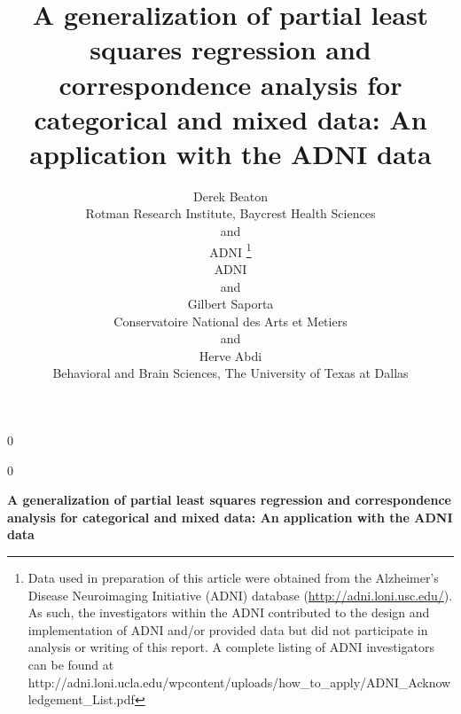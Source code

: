\documentclass[12pt]{article}
\newcommand{\blind}{0}
\begin{document}
\def\spacingset#1{\renewcommand{\baselinestretch}%
{#1}\small\normalsize} \spacingset{1}



\blind
{
  \title{\bf A generalization of partial least squares regression and correspondence
analysis for categorical and mixed data: An application with the ADNI
data}

  \author{
        Derek Beaton \\
    Rotman Research Institute, Baycrest Health Sciences\\
     and \\     ADNI \thanks{Data used in preparation of this article were obtained from the
Alzheimer's Disease Neuroimaging Initiative (ADNI) database
(\url{http://adni.loni.usc.edu/}). As such, the investigators within the
ADNI contributed to the design and implementation of ADNI and/or
provided data but did not participate in analysis or writing of this
report. A complete listing of ADNI investigators can be found at
http://adni.loni.ucla.edu/wpcontent/uploads/how\_to\_apply/ADNI\_Acknowledgement\_List.pdf} \\
    ADNI\\
     and \\     Gilbert Saporta \\
    Conservatoire National des Arts et Metiers\\
     and \\     Herve Abdi \\
    Behavioral and Brain Sciences, The University of Texas at Dallas\\
      }
  \maketitle
} \fi

\blind
{
  \bigskip
  \bigskip
  \bigskip
  \begin{center}
    {\LARGE\bf A generalization of partial least squares regression and correspondence
analysis for categorical and mixed data: An application with the ADNI
data}
  \end{center}
  \medskip
} \fi
\end{document}
